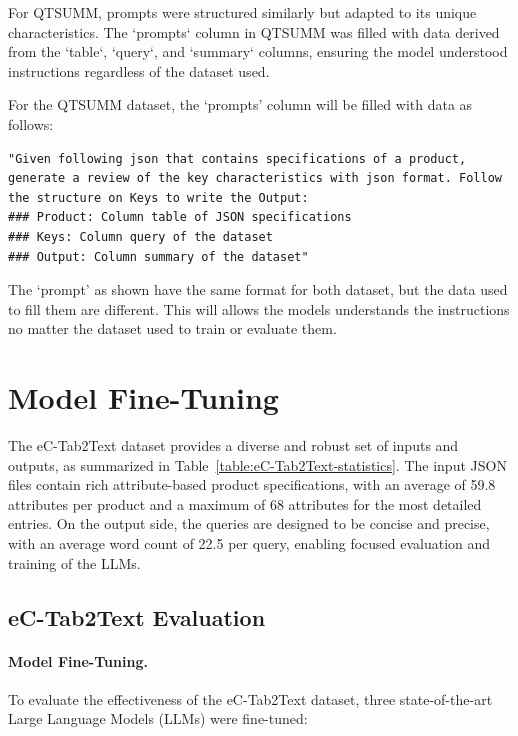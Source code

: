 For QTSUMM, prompts were structured similarly but adapted to its unique characteristics. The `prompts` column in QTSUMM was filled with data derived from the `table`, `query`, and `summary` columns, ensuring the model understood instructions regardless of the dataset used.

For the QTSUMM dataset, the `prompts' column will be filled with data as follows:
\newpage
\begin{lstlisting}[style=textstyle, frame = single, caption=Prompt structuration, label=code:prompt-structuration]
"Given following json that contains specifications of a product, generate a review of the key characteristics with json format. Follow the structure on Keys to write the Output: 
### Product: Column table of JSON specifications
### Keys: Column query of the dataset
### Output: Column summary of the dataset"
\end{lstlisting}
The `prompt' as shown have the same format for both dataset, but the data used to fill them are different. This will allows the models understands the instructions no matter the dataset used to train or evaluate them.

\section{Model Fine-Tuning}

The eC-Tab2Text dataset provides a diverse and robust set of inputs and outputs, as summarized in Table~\ref{table:eC-Tab2Text-statistics}. The input JSON files contain rich attribute-based product specifications, with an average of 59.8 attributes per product and a maximum of 68 attributes for the most detailed entries. On the output side, the queries are designed to be concise and precise, with an average word count of 22.5 per query, enabling focused evaluation and training of the LLMs.

\subsection{eC-Tab2Text Evaluation} 
\label{sec:evaluation}

\paragraph{Model Fine-Tuning.} To evaluate the effectiveness of the eC-Tab2Text dataset, three state-of-the-art Large Language Models (LLMs) were fine-tuned:

